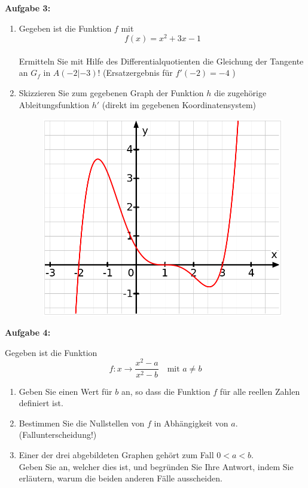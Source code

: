 \documentclass[a4paper,12pt]{article}
\newcommand{\Aufgabe}[1]{
  {
  \vspace*{0.5cm}
  \textsf{\textbf{Aufgabe #1}}
  \vspace*{0.2cm}
  
  }
}
\begin{document}
\Aufgabe{3:}

\begin{enumerate}[label={\alph*)}]
  \item Gegeben ist die Funktion $f$ mit 
    \[ f(x) = x^2+3x-1 \]\\
    Ermitteln Sie mit Hilfe des Differentialquotienten die Gleichung der Tangente an $G_f$ in $A(-2|-3)$! (Ersatzergebnis für $f'(-2)=-4$ )
    \item Skizzieren Sie zum gegebenen Graph der Funktion $h$ die zugehörige Ableitungsfunktion $h'$ (direkt im gegebenen Koordinatensystem)

\begin{figure}[h!]
  \begin{center}
    \includegraphics[width=0.7 \linewidth]{Q11_1KlausurJanuar2022_1.png}
  \end{center}
\end{figure}

\end{enumerate}

\enlargethispage{3cm}
\Aufgabe{4:}
Gegeben ist die Funktion 
\[f:x \rightarrow \frac{x^2-a}{x^2-b} \quad \text{mit $a\neq b$}\]

\begin{enumerate}[label={\alph*)}]
  \item Geben Sie einen Wert für $b$ an, so dass die Funktion $f$ für alle reellen Zahlen definiert ist.
  \item Bestimmen Sie die Nullstellen von $f$ in Abhängigkeit von $a$. (Fallunterscheidung!)
  \item Einer der drei abgebildeten Graphen gehört zum Fall $0 < a < b$.\\
    Geben Sie an, welcher dies ist, und begründen Sie Ihre Antwort, indem Sie erläutern, warum die beiden anderen Fälle ausscheiden.
\end{enumerate}
\end{document}
